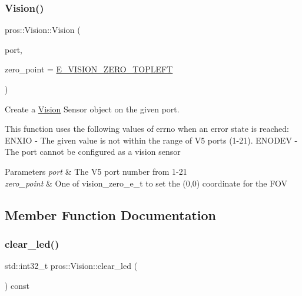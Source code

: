 \subsubsection{\texorpdfstring{Vision()}{Vision()}}
{\footnotesize\ttfamily pros\+::\+Vision\+::\+Vision (\begin{DoxyParamCaption}\item[{std\+::uint8\+\_\+t}]{port,  }\item[{\hyperlink{vision_8h_a2e8bc1c48f8aab12275bfc1868fbbad6}{vision\+\_\+zero\+\_\+e\+\_\+t}}]{zero\+\_\+point = {\ttfamily \hyperlink{vision_8h_aef7c8269b3fb0dfbf4e597b2d8dd7af5a0ff244c5f3e9771f962986e25b00ff3d}{E\+\_\+\+V\+I\+S\+I\+O\+N\+\_\+\+Z\+E\+R\+O\+\_\+\+T\+O\+P\+L\+E\+FT}} }\end{DoxyParamCaption})}

Create a \hyperlink{classpros_1_1Vision}{Vision} Sensor object on the given port.

This function uses the following values of errno when an error state is reached\+: E\+N\+X\+IO -\/ The given value is not within the range of V5 ports (1-\/21). E\+N\+O\+D\+EV -\/ The port cannot be configured as a vision sensor


\begin{DoxyParams}{Parameters}
{\em port} & The V5 port number from 1-\/21 \\
\hline
{\em zero\+\_\+point} & One of vision\+\_\+zero\+\_\+e\+\_\+t to set the (0,0) coordinate for the F\+OV \\
\hline
\end{DoxyParams}


\subsection{Member Function Documentation}
\mbox{\label{classpros_1_1Vision_a00f02cfb09ca224c2a7735be918e941d}} 
\subsubsection{\texorpdfstring{clear\+\_\+led()}{clear\_led()}}
{\footnotesize\ttfamily std\+::int32\+\_\+t pros\+::\+Vision\+::clear\+\_\+led (\begin{DoxyParamCaption}\item[{void}]{ }\end{DoxyParamCaption}) const}

